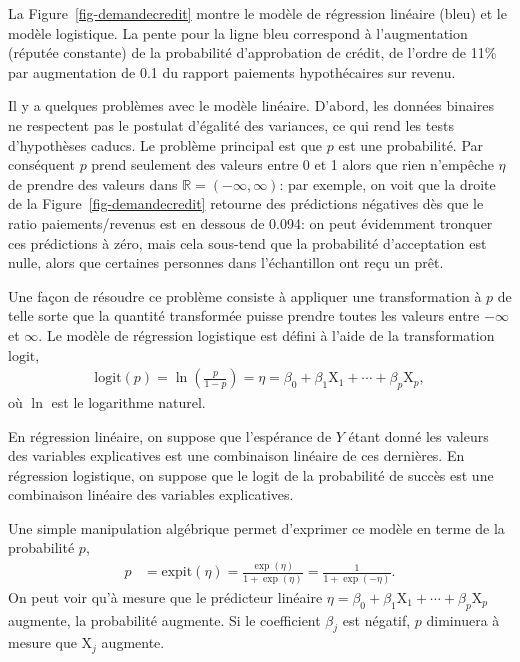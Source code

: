 \documentclass[
  11pt,
  letterpaper,
]{book}
\theoremstyle{definition}
\theoremstyle{remark}
\begin{document}
La Figure~\ref{fig-demandecredit} montre le modèle de régression
linéaire (bleu) et le modèle logistique. La pente pour la ligne bleu
correspond à l'augmentation (réputée constante) de la probabilité
d'approbation de crédit, de l'ordre de 11\% par augmentation de 0.1 du
rapport paiements hypothécaires sur revenu.

Il y a quelques problèmes avec le modèle linéaire. D'abord, les données
binaires ne respectent pas le postulat d'égalité des variances, ce qui
rend les tests d'hypothèses caducs. Le problème principal est que \(p\)
est une probabilité. Par conséquent \(p\) prend seulement des valeurs
entre 0 et 1 alors que rien n'empêche \(\eta\) de prendre des valeurs
dans \(\mathbb{R}=(-\infty, \infty)\): par exemple, on voit que la
droite de la Figure~\ref{fig-demandecredit} retourne des prédictions
négatives dès que le ratio paiements/revenus est en dessous de 0.094: on
peut évidemment tronquer ces prédictions à zéro, mais cela sous-tend que
la probabilité d'acceptation est nulle, alors que certaines personnes
dans l'échantillon ont reçu un prêt.

Une façon de résoudre ce problème consiste à appliquer une
transformation à \(p\) de telle sorte que la quantité transformée puisse
prendre toutes les valeurs entre \(-\infty\) et \(\infty\). Le modèle de
régression logistique est défini à l'aide de la transformation
\(\textrm{logit}\), \begin{align*}
\textrm{logit}(p) = \ln\left( \frac{p}{1-p}\right)=\eta=\beta_0 + \beta_1\mathrm{X}_1 + \cdots + \beta_p \mathrm{X}_p,
\end{align*} où \(\ln\) est le logarithme naturel.

En régression linéaire, on suppose que l'espérance de \(Y\) étant donné
les valeurs des variables explicatives est une combinaison linéaire de
ces dernières. En régression logistique, on suppose que le logit de la
probabilité de succès est une combinaison linéaire des variables
explicatives.

Une simple manipulation algébrique permet d'exprimer ce modèle en terme
de la probabilité \(p\), \begin{align*}
 p &= \textrm{expit}(\eta) = \frac{\exp(\eta)}{1+\exp(\eta)}
= \frac{1}{1+\exp(-\eta)}.
\end{align*} On peut voir qu'à mesure que le prédicteur linéaire
\(\eta=\beta_0+\beta_1\mathrm{X}_1 + \cdots + \beta_p\mathrm{X}_p\)
augmente, la probabilité augmente. Si le coefficient \(\beta_j\) est
négatif, \(p\) diminuera à mesure que \(\mathrm{X}_j\) augmente.
\end{document}

